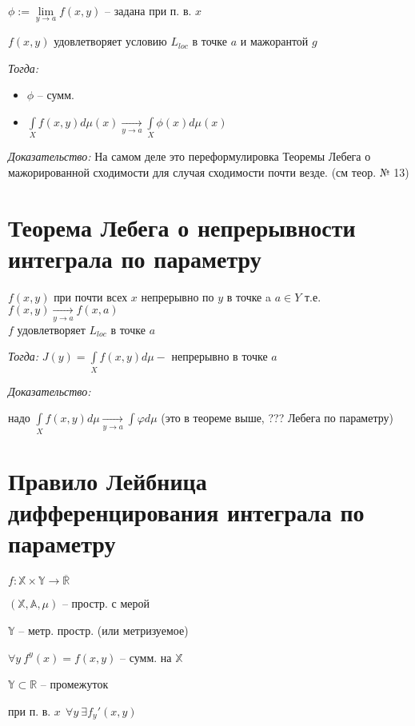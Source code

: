 \documentclass[paper=a4, fontsize=14pt]{report}
\begin{document}
$ \phi := \lim\limits_{y \rightarrow a} f(x, y) $ -- задана при п. в. $ x $

$ f(x,y) $ удовлетворяет условию $ L_{loc} $ в точке $ a $ и мажорантой $ g $


\emph{Тогда:}

\begin{itemize}
	\item $ \phi $ -- сумм.
	\item $ \int\limits_{X} f(x, y) d\mu (x) \underset{y \rightarrow a}{\longrightarrow} \int\limits_{X} \phi(x) d\mu(x) $
\end{itemize}

\emph{Доказательство:} На самом деле это переформулировка Теоремы Лебега о мажорированной сходимости для случая сходимости почти везде. (см теор. № 13)


\section{Теорема Лебега о непрерывности интеграла по параметру}

$f(x,y)$ при почти всех $ x $ непрерывно по $ y $ в точке a $ a \in Y$ т.е. $f(x,y) \underset{y \rightarrow a}{\rightarrow} f(x,a)$ \\ $ f $ удовлетворяет $L_{loc} $ в точке $ a $

\emph{Тогда:}
$J(y) = \int\limits_{X} f(x,y)d\mu - $ непрерывно в точке $ a $ 


\emph{Доказательство:}

надо $\int\limits_{X} f(x,y)d\mu \underset{y \rightarrow a}{\rightarrow} \int\limits \varphi d\mu$ (это в теореме выше, ??? Лебега по параметру)

\section{Правило Лейбница дифференцирования интеграла по параметру}

$ f : \mathbb{X} \times \mathbb{Y} \rightarrow \overline{\mathbb{R}}$

$ (\mathbb{X}, \mathbb{A}, \mu) $ -- простр. с мерой

$ \mathbb{Y} $ -- метр. простр. (или метризуемое)

$ \forall y ~ f^y(x) = f(x, y) $ -- сумм. на $ \mathbb{X} $

\bigskip

$ \mathbb{Y} \subset \mathbb{R} $ -- промежуток

при п. в. $ x ~~ \forall y ~ \exists f_y'(x, y)$
\end{document}
